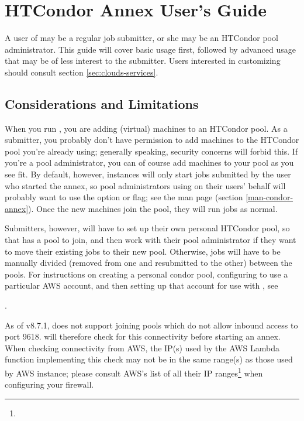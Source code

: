 \section{\label{sec:clouds-annex}HTCondor Annex User's Guide}

A user of  may be a regular job submitter, or she may be an
HTCondor pool administrator.  This guide will cover basic  usage
first, followed by advanced usage that may be of less interest to the
submitter.  Users interested in customizing  should consult
section \ref{sec:clouds-services}.

\subsection{Considerations and Limitations}

When you run , you are adding (virtual) machines to an HTCondor
pool.  As a submitter, you probably don't have permission to add machines to
the HTCondor pool you're already using; generally speaking, security concerns
will forbid this.  If you're a pool administrator, you can of course add
machines to your pool as you see fit.  By default, however, 
instances will only start jobs submitted by the user who started the annex,
so pool administrators using  on their users' behalf will
probably want to use the  option or  flag;
see the man page (section \ref{man-condor-annex}).  Once the new machines
join the pool, they will run jobs as normal.

Submitters, however, will have to set up their own personal HTCondor pool,
so that  has a pool to join, and then work with their pool
administrator if they want to move their existing jobs to their new pool.
Otherwise, jobs will have to be manually divided (removed from one and
resubmitted to the other) between the pools.  For instructions on creating a
personal condor pool, configuring  to use a particular AWS
account, and then setting up that account for use with , see


.

As of v8.7.1,  does not support joining pools which do not
allow inbound access to port 9618.   will therefore check
for this connectivity before starting an annex.  When checking connectivity
from AWS, the IP(s) used by the AWS Lambda function implementing this check
may not be in the same range(s) as those used by AWS instance; please
consult AWS's list of all their IP
ranges\footnote{}
when configuring your firewall.

